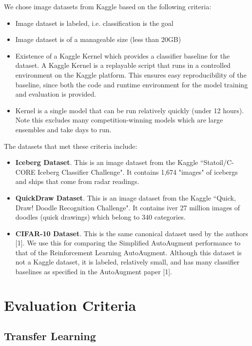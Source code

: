 \documentclass[10pt,twocolumn,letterpaper]{article}
\begin{document}
We chose image datasets from Kaggle based on the following criteria:

\begin{itemize}
  \item Image dataset is labeled, i.e. classification is the goal
  \item Image dataset is of a manageable size (less than 20GB)
  \item Existence of a Kaggle Kernel which provides a classifier baseline for the dataset.  A Kaggle Kernel is a replayable script that runs in a controlled environment on the Kaggle platform.  This ensures easy reproducibility of the baseline, since both the code and runtime environment for the model training and evaluation is provided.
  \item Kernel is a single model that can be run relatively quickly (under 12 hours).  Note this excludes many competition-winning models which are large ensembles and take days to run.
\end{itemize}

The datasets that met these criteria include:

\begin{itemize}
  \item \textbf{Iceberg Dataset}.  This is an image dataset from the Kaggle “Statoil/C-CORE Iceberg Classifier Challenge".  It contains 1,674 "images" of icebergs and ships that come from radar readings.  
  \item \textbf{QuickDraw Dataset}.  This is an image dataset from the Kaggle “Quick, Draw! Doodle Recognition Challenge".  It contains iver 27 million images of doodles (quick drawings) which belong to 340 categories.  
  \item \textbf{CIFAR-10 Dataset}.  This is the same canonical dataset used by the authors [1].  We use this for comparing the Simplified AutoAugment performance to that of the Reinforcement Learning AutoAugment.  Although this dataset is not a Kaggle dataset, it is labeled, relatively small, and has many classifier baselines as specified in the AutoAugment paper [1].        
\end{itemize}


\section{Evaluation Criteria}

\subsection{Transfer Learning}
\end{document}
